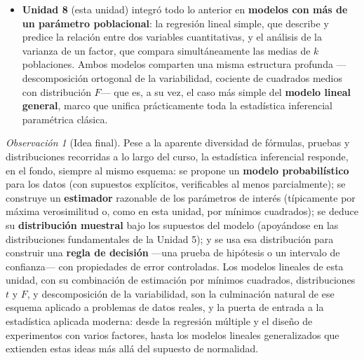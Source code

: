 \documentclass[11pt,a4paper]{article}
\theoremstyle{plain}
\theoremstyle{definition}
\theoremstyle{remark}
\newtheorem{observacion}[teorema]{Observación}
\begin{document}
\begin{itemize}
\item \textbf{Unidad 8} (esta unidad) integró todo lo anterior en \textbf{modelos con más de un parámetro poblacional}: la regresión lineal simple, que describe y predice la relación entre dos variables cuantitativas, y el análisis de la varianza de un factor, que compara simultáneamente las medias de $k$ poblaciones. Ambos modelos comparten una misma estructura profunda —descomposición ortogonal de la variabilidad, cociente de cuadrados medios con distribución $F$— que es, a su vez, el caso más simple del \textbf{modelo lineal general}, marco que unifica prácticamente toda la estadística inferencial paramétrica clásica.
\end{itemize}

\begin{observacion}[Idea final]
Pese a la aparente diversidad de fórmulas, pruebas y distribuciones recorridas a lo largo del curso, la estadística inferencial responde, en el fondo, siempre al mismo esquema: se propone un \textbf{modelo probabilístico} para los datos (con supuestos explícitos, verificables al menos parcialmente); se construye un \textbf{estimador} razonable de los parámetros de interés (típicamente por máxima verosimilitud o, como en esta unidad, por mínimos cuadrados); se deduce su \textbf{distribución muestral} bajo los supuestos del modelo (apoyándose en las distribuciones fundamentales de la Unidad 5); y se usa esa distribución para construir una \textbf{regla de decisión} —una prueba de hipótesis o un intervalo de confianza— con propiedades de error controladas. Los modelos lineales de esta unidad, con su combinación de estimación por mínimos cuadrados, distribuciones $t$ y $F$, y descomposición de la variabilidad, son la culminación natural de ese esquema aplicado a problemas de datos reales, y la puerta de entrada a la estadística aplicada moderna: desde la regresión múltiple y el diseño de experimentos con varios factores, hasta los modelos lineales generalizados que extienden estas ideas más allá del supuesto de normalidad.
\end{observacion}
\end{document}
